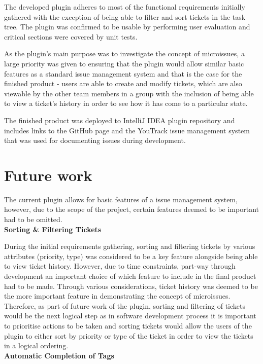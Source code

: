 \documentclass{4thYearProject}
\begin{document}
The developed plugin adheres to most of the functional requirements initially gathered with the exception of being able to filter and sort tickets in the task tree. The plugin was confirmed to be usable by performing user evaluation and critical sections were covered by unit tests.  

As the plugin's main purpose was to investigate the concept of microissues, a large priority was given to ensuring that the plugin would allow similar basic features as a standard issue management system and that is the case for the finished product - users are able to create and modify tickets, which are also viewable by the other team members in a group with the inclusion of being able to view a ticket's history in order to see how it has come to a particular state. 

The finished product was deployed to IntelliJ IDEA plugin repository \cite{deployed} and includes links to the GitHub page and the YouTrack issue management system that was used for documenting issues during development.   

\section{Future work}

The current plugin allows for basic features of a issue management system, however, due to the scope of the project, certain features deemed to be important had to be omitted. \\
\newline
\textbf{Sorting \& Filtering Tickets}

During the initial requirements gathering, sorting and filtering tickets by various attributes (priority, type) was considered to be a key feature alongside being able to view ticket history. However, due to time constraints, part-way through development an important choice of which feature to include in the final product had to be made. Through various considerations, ticket history was deemed to be the more important feature in demonstrating the concept of microissues. Therefore, as part of future work of the plugin, sorting and filtering of tickets would be the next logical step as in software development process it is important to prioritise actions to be taken and sorting tickets would allow the users of the plugin to either sort by priority or type of the ticket in order to view the tickets in a logical ordering. \\
\newline
\textbf{Automatic Completion of Tags}
\end{document}
